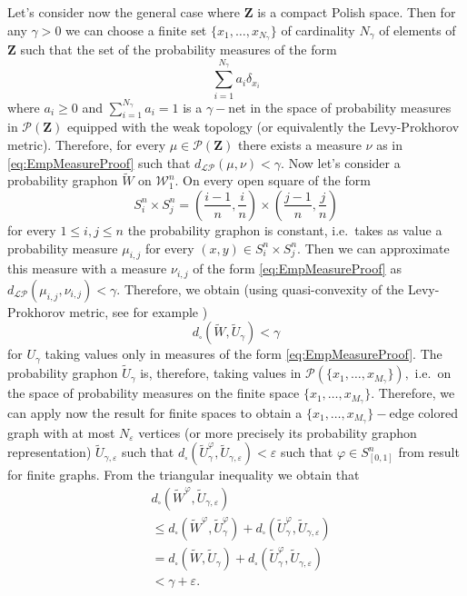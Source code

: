 \documentclass[12pt,twoside,a4paper]{article}
\newcommand{\cP}{{\mathcal P}}  %
\newcommand{\cW}{{\mathcal W}}  %
\newcommand{\Square}{{S^n_i\times S^n_j}}
\newcommand{\Space}{\mathbf{Z}}
\begin{document}
Let's consider now the general case where $\Space$ is a compact Polish space. Then for any $\gamma>0$ we can choose a finite set $\{x_1,\ldots, x_{N_{\gamma}}\}$ of cardinality $N_{\gamma}$ of elements of $\Space$ such that the set of the probability measures of the form \begin{equation}\label{eq:EmpMeasureProof}
   \sum^{N_{\gamma}}_{i=1}a_i\delta_{x_i}
\end{equation}
where $a_i\geq 0$ and $\sum^{N_{\gamma}}_{i=1}a_i=1$  is a $\gamma-$net in the space of probability measures in $\cP(\Space)$ equipped with the weak topology (or equivalently the Levy-Prokhorov metric). Therefore, for every $\mu\in \cP(\Space)$ there exists a measure $\nu$ as in \eqref{eq:EmpMeasureProof} such that $d_{\mathcal{LP}}(\mu,\nu)<\gamma.$
Now let's consider a probability graphon $\widetilde{W}$ on $\cW^n_1.$ On every open square of the form
\[
\Square=\left( \frac{i-1}{n}, \frac{i}{n} \right) \times \left( \frac{j-1}{n}, \frac{j}{n} \right)
\]
for every $1 \leq i,j \leq n$ the probability graphon is constant, i.e.\ takes as value a probability measure $\mu_{i,j}$ for every $(x,y)\in\Square.$ Then we can approximate this measure with a measure $\nu_{i,j}$ of the form \eqref{eq:EmpMeasureProof} as $d_{\mathcal{LP}}(\mu_{i,j},\nu_{i,j})<\gamma.$ Therefore, we obtain (using quasi-convexity of the Levy-Prokhorov metric, see for example \cite[Lemma 3.21]{abraham2023probabilitygraphons})
\begin{equation*}
    d_{\square}(\widetilde{W},\widetilde{U}_{\gamma})<\gamma
\end{equation*}
for $U_{\gamma}$ taking values only in measures of the form  \eqref{eq:EmpMeasureProof}. The probability graphon $\widetilde{U}_{\gamma}$ is, therefore, taking values in $\cP(\{x_1,\ldots,x_{M_{\gamma}}\}),$ i.e.\ on the space of probability measures on the finite space $\{x_1,\ldots,x_{M_{\gamma}}\}.$ Therefore, we can apply now the result for finite spaces to obtain a $\{x_1,\ldots,x_{M_{\gamma}}\}-$edge colored graph with at most $N_{\varepsilon}$ vertices (or more precisely its probability graphon representation) $\widetilde{U}_{\gamma,\varepsilon}$ such that  $d_{\square}(\widetilde{U}^{\varphi}_{\gamma},\widetilde{U}_{\gamma,\varepsilon})<\varepsilon$ such that $\varphi\in S^n_{[0,1]}$ from result for finite graphs. From the triangular inequality we obtain that 
\begin{equation*}
\begin{aligned}
& d_{\square}(\widetilde{W}^{\varphi},\widetilde{U}_{\gamma,\varepsilon})  
\\
&\leq
 d_{\square}(\widetilde{W}^{\varphi},\widetilde{U}^{\varphi}_{\gamma})+d_{\square}(\widetilde{U}^{\varphi}_{\gamma},\widetilde{U}_{\gamma,\varepsilon})\\
&
=d_{\square}(\widetilde{W},\widetilde{U}_{\gamma})+d_{\square}(\widetilde{U}^{\varphi}_{\gamma},\widetilde{U}_{\gamma,\varepsilon})
 \\
 &<\gamma+\varepsilon.
 \end{aligned}
\end{equation*}
\end{document}
